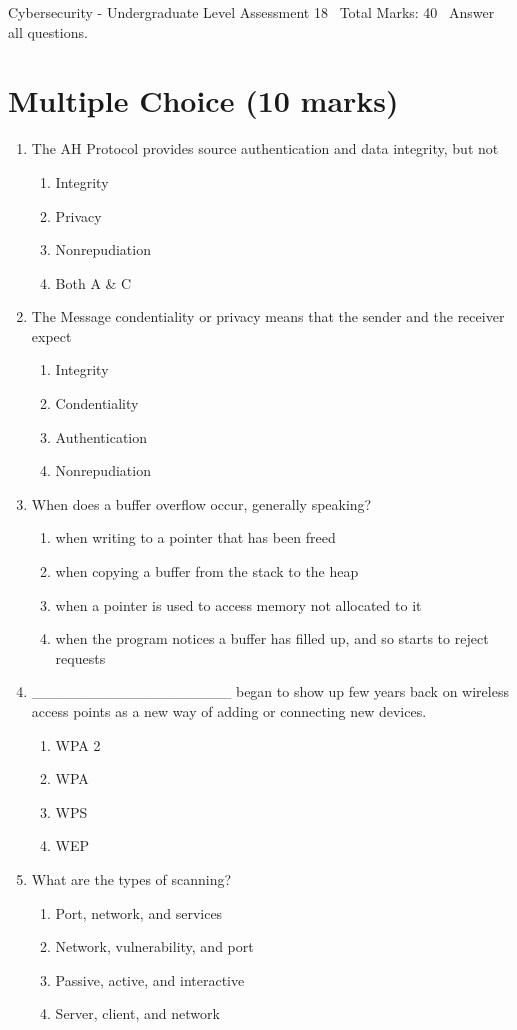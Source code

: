 \documentclass[12pt]{article}
\begin{document}
\begin{center}
Cybersecurity - Undergraduate Level Assessment 18 \
Total Marks: 40 \
Answer all questions.
\end{center}

\section*{Multiple Choice (10 marks)}
\begin{enumerate}[label=\arabic*.]
\item The AH Protocol provides source authentication and data integrity, but not
\begin{enumerate}[label=(\alph*)]
    \item Integrity
    \item Privacy
    \item Nonrepudiation
    \item Both A \& C
\end{enumerate}
\item The Message condentiality or privacy means that the sender and the receiver expect
\begin{enumerate}[label=(\alph*)]
    \item Integrity
    \item Condentiality
    \item Authentication
    \item Nonrepudiation
\end{enumerate}
\item When does a buffer overflow occur, generally speaking?
\begin{enumerate}[label=(\alph*)]
    \item when writing to a pointer that has been freed
    \item when copying a buffer from the stack to the heap
    \item when a pointer is used to access memory not allocated to it
    \item when the program notices a buffer has filled up, and so starts to reject requests
\end{enumerate}
\item \_\_\_\_\_\_\_\_\_\_\_\_\_\_\_\_\_\_\_ began to show up few years back on wireless access points as a new way of adding or connecting new devices.
\begin{enumerate}[label=(\alph*)]
    \item WPA 2
    \item WPA
    \item WPS
    \item WEP
\end{enumerate}
\item What are the types of scanning?
\begin{enumerate}[label=(\alph*)]
    \item Port, network, and services
    \item Network, vulnerability, and port
    \item Passive, active, and interactive
    \item Server, client, and network
\end{enumerate}
\end{enumerate}
\end{document}
